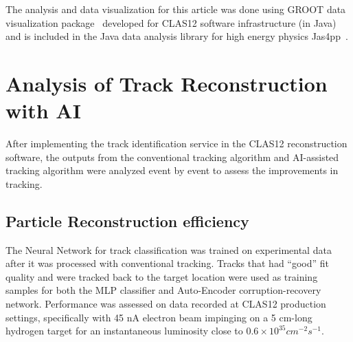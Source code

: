 \documentclass[aps,prl,preprint,12pt]{elsarticle}
\begin{document}
The analysis and data visualization for this article was done using GROOT data visualization package~\cite{groot-github} 
developed for CLAS12 software infrastructure (in Java) and is included in the Java data analysis library for high energy 
physics Jas4pp~\cite{Chekanov:2020bja}.

\section{Analysis of Track Reconstruction with AI}

After implementing the track identification service in the CLAS12 
reconstruction software, the outputs from the conventional tracking 
algorithm and AI-assisted tracking algorithm were analyzed event by 
event to assess the improvements in tracking. 
 
 \subsection{Particle Reconstruction efficiency}
 
 The Neural Network for track classification was trained on experimental 
 data after it was processed with conventional tracking. Tracks that had ``good'' 
 fit quality and were tracked back to the target location were used as training 
 samples for both the MLP classifier and Auto-Encoder corruption-recovery network. 
 Performance was assessed on data recorded at CLAS12 production settings, 
 specifically with 45 nA electron beam impinging on a 5 cm-long hydrogen target 
 for an instantaneous luminosity close to $0.6\times10^{35} cm^{-2} s^{-1}$.
\end{document}
